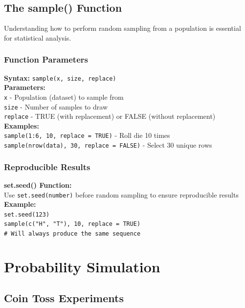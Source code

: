 \documentclass[11pt,a4paper]{article}
\begin{document}
\subsection{The sample() Function}

Understanding how to perform random sampling from a population is essential for statistical analysis.

\subsubsection{Function Parameters}

\begin{formulabox}
\textbf{Syntax:} \texttt{sample(x, size, replace)}\\[0.3cm]
\textbf{Parameters:}\\
\texttt{x} - Population (dataset) to sample from\\
\texttt{size} - Number of samples to draw\\
\texttt{replace} - TRUE (with replacement) or FALSE (without replacement)\\[0.3cm]
\textbf{Examples:}\\
\texttt{sample(1:6, 10, replace = TRUE)} - Roll die 10 times\\
\texttt{sample(nrow(data), 30, replace = FALSE)} - Select 30 unique rows
\end{formulabox}

\subsubsection{Reproducible Results}

\begin{formulabox}
\textbf{set.seed() Function:}\\
Use \texttt{set.seed(number)} before random sampling to ensure reproducible results\\[0.3cm]
\textbf{Example:}\\
\texttt{set.seed(123)}\\
\texttt{sample(c("H", "T"), 10, replace = TRUE)}\\
\texttt{# Will always produce the same sequence}
\end{formulabox}

\section{Probability Simulation}

\subsection{Coin Toss Experiments}
\end{document}
